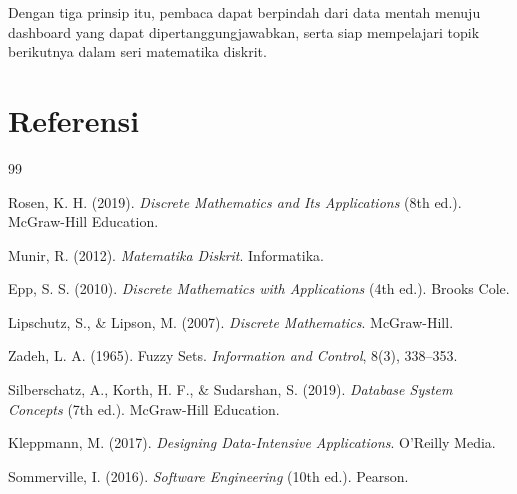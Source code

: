 \documentclass[11pt,a4paper]{article}
\begin{document}
Dengan tiga prinsip itu, pembaca dapat berpindah dari data mentah menuju dashboard yang dapat dipertanggungjawabkan, serta siap mempelajari topik berikutnya dalam seri matematika diskrit.

\newpage
\section*{Referensi}

\begin{thebibliography}{99}

	Rosen, K. H. (2019).
	\textit{Discrete Mathematics and Its Applications} (8th ed.).
	McGraw-Hill Education.

	Munir, R. (2012).
	\textit{Matematika Diskrit}.
	Informatika.

	Epp, S. S. (2010).
	\textit{Discrete Mathematics with Applications} (4th ed.).
	Brooks Cole.

	Lipschutz, S., \& Lipson, M. (2007).
	\textit{Discrete Mathematics}.
	McGraw-Hill.

	Zadeh, L. A. (1965).
	Fuzzy Sets.
	\textit{Information and Control}, 8(3), 338--353.

	Silberschatz, A., Korth, H. F., \& Sudarshan, S. (2019).
	\textit{Database System Concepts} (7th ed.).
	McGraw-Hill Education.

	Kleppmann, M. (2017).
	\textit{Designing Data-Intensive Applications}.
	O'Reilly Media.

	Sommerville, I. (2016).
	\textit{Software Engineering} (10th ed.).
	Pearson.

\end{thebibliography}
\end{document}
